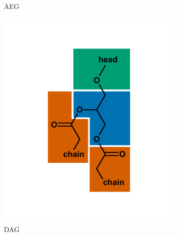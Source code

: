{\begin{figure}[p]
\begin{subfigure}[b]{.3\linewidth}
    	\caption{AEG}
        \label{fig:AEG}
    \end{subfigure}
    \begin{subfigure}[b]{.3\linewidth}
        	\includegraphics[width=\linewidth]{figs_ch1/DAG}
    	\caption{DAG}
        \label{fig:DAG}
    \end{subfigure}
    \begin{subfigure}[b]{.3\linewidth}

\end{subfigure}
\end{figure}}
